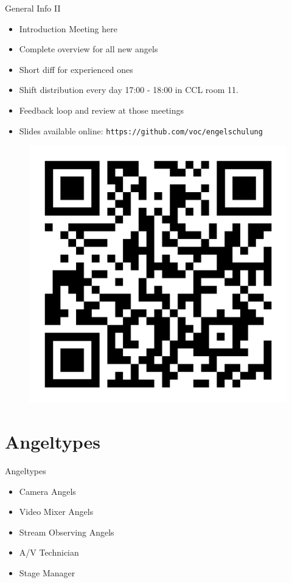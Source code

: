 \documentclass[aspectratio=169]{beamer}
\begin{document}
\begin{frame}{General Info II}
	\begin{itemize}
		\item Introduction Meeting here
		\item Complete overview for all new angels
		\item Short diff for experienced ones
		\item Shift distribution every day 17:00 - 18:00 in CCL room 11.
		\item Feedback loop and review at those meetings
		\item Slides available online: \texttt{https://github.com/voc/engelschulung}
	\end{itemize}
	\begin{figure} 
		\centering
		\includegraphics[height=0.4\textheight]{images/qr-code.png}
	\end{figure}
\end{frame}

\section{Angeltypes}
\begin{frame}{Angeltypes}
	\begin{itemize}
		\item Camera Angels
		\item Video Mixer Angels
		\item Stream Observing Angels
		\item A/V Technician
		\item Stage Manager
	\end{itemize}
\end{frame}
\end{document}
